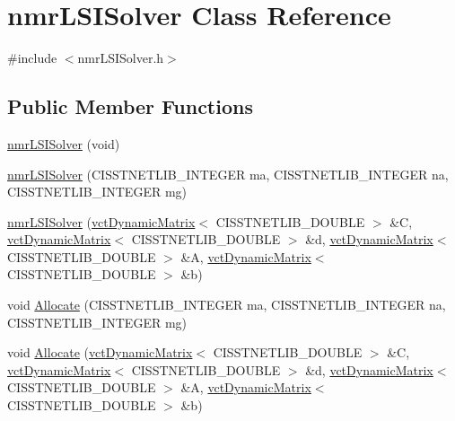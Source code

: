 \hypertarget{classnmr_l_s_i_solver}{\section{nmr\-L\-S\-I\-Solver Class Reference}
\label{classnmr_l_s_i_solver}
}


{\ttfamily \#include $<$nmr\-L\-S\-I\-Solver.\-h$>$}

\subsection*{Public Member Functions}
\begin{DoxyCompactItemize}
\item 
\hyperlink{classnmr_l_s_i_solver_a33435a1ffaf867d921ef716e4c0015b6}{nmr\-L\-S\-I\-Solver} (void)
\item 
\hyperlink{classnmr_l_s_i_solver_af83ac6b15631b23cade7b4c13749c06c}{nmr\-L\-S\-I\-Solver} (C\-I\-S\-S\-T\-N\-E\-T\-L\-I\-B\-\_\-\-I\-N\-T\-E\-G\-E\-R ma, C\-I\-S\-S\-T\-N\-E\-T\-L\-I\-B\-\_\-\-I\-N\-T\-E\-G\-E\-R na, C\-I\-S\-S\-T\-N\-E\-T\-L\-I\-B\-\_\-\-I\-N\-T\-E\-G\-E\-R mg)
\item 
\hyperlink{classnmr_l_s_i_solver_a00726a765ad79e3c35b5b8a0abb23bf4}{nmr\-L\-S\-I\-Solver} (\hyperlink{classvct_dynamic_matrix}{vct\-Dynamic\-Matrix}$<$ C\-I\-S\-S\-T\-N\-E\-T\-L\-I\-B\-\_\-\-D\-O\-U\-B\-L\-E $>$ \&C, \hyperlink{classvct_dynamic_matrix}{vct\-Dynamic\-Matrix}$<$ C\-I\-S\-S\-T\-N\-E\-T\-L\-I\-B\-\_\-\-D\-O\-U\-B\-L\-E $>$ \&d, \hyperlink{classvct_dynamic_matrix}{vct\-Dynamic\-Matrix}$<$ C\-I\-S\-S\-T\-N\-E\-T\-L\-I\-B\-\_\-\-D\-O\-U\-B\-L\-E $>$ \&A, \hyperlink{classvct_dynamic_matrix}{vct\-Dynamic\-Matrix}$<$ C\-I\-S\-S\-T\-N\-E\-T\-L\-I\-B\-\_\-\-D\-O\-U\-B\-L\-E $>$ \&b)
\item 
void \hyperlink{classnmr_l_s_i_solver_af022c78f7d093cc0ba4bdbf470fbe686}{Allocate} (C\-I\-S\-S\-T\-N\-E\-T\-L\-I\-B\-\_\-\-I\-N\-T\-E\-G\-E\-R ma, C\-I\-S\-S\-T\-N\-E\-T\-L\-I\-B\-\_\-\-I\-N\-T\-E\-G\-E\-R na, C\-I\-S\-S\-T\-N\-E\-T\-L\-I\-B\-\_\-\-I\-N\-T\-E\-G\-E\-R mg)
\item 
void \hyperlink{classnmr_l_s_i_solver_ac9d1a14ba79b53b641a63f01a50f2c84}{Allocate} (\hyperlink{classvct_dynamic_matrix}{vct\-Dynamic\-Matrix}$<$ C\-I\-S\-S\-T\-N\-E\-T\-L\-I\-B\-\_\-\-D\-O\-U\-B\-L\-E $>$ \&C, \hyperlink{classvct_dynamic_matrix}{vct\-Dynamic\-Matrix}$<$ C\-I\-S\-S\-T\-N\-E\-T\-L\-I\-B\-\_\-\-D\-O\-U\-B\-L\-E $>$ \&d, \hyperlink{classvct_dynamic_matrix}{vct\-Dynamic\-Matrix}$<$ C\-I\-S\-S\-T\-N\-E\-T\-L\-I\-B\-\_\-\-D\-O\-U\-B\-L\-E $>$ \&A, \hyperlink{classvct_dynamic_matrix}{vct\-Dynamic\-Matrix}$<$ C\-I\-S\-S\-T\-N\-E\-T\-L\-I\-B\-\_\-\-D\-O\-U\-B\-L\-E $>$ \&b)

\end{DoxyCompactItemize}
